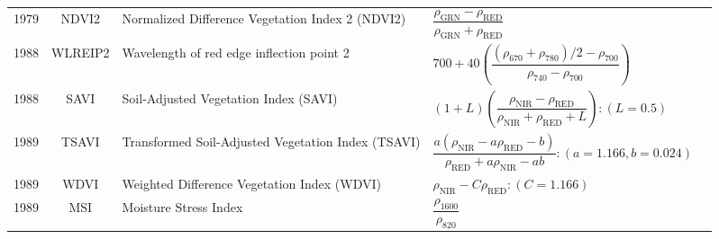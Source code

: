 \documentclass[10pt]{article}
\begin{document}
\begin{ThreePartTable}
\begin{longtable}{c c m{2.80in} M{2.80in} M{1.5in}}
  1979 & NDVI2   & Normalized Difference Vegetation Index 2 (NDVI2)                               & $\dfrac{\rho_\text{GRN}-\rho_\text{RED}}{\rho_\text{GRN}+\rho_\text{RED}}$                                                                                                                                                                                                              & \citet{Tucker1979}                                  \\
  1988 & WLREIP2 & Wavelength of red edge inflection point 2                                      & $700+40\left(\dfrac{(\rho_{670}+\rho_{780})/2-\rho_{700}}{\rho_{740}-\rho_{700}}\right)$                                                                                                                                                                                                & \citet{Guyot1988,Cho2006}                           \\
  1988 & SAVI    & Soil-Adjusted Vegetation Index (SAVI)                                          & $(1 + L)\left(\dfrac{\rho_\text{NIR}-\rho_\text{RED}}{\rho_\text{NIR}+\rho_\text{RED}+L}\right):(L=0.5)$                                                                                                                                                                                & \citet{Huete1988}                                   \\
  1989 & TSAVI   & Transformed Soil-Adjusted Vegetation Index (TSAVI)                             & $\dfrac{a(\rho_\text{NIR}-a\rho_\text{RED}-b)}{\rho_\text{RED}+a\rho_\text{NIR}-ab}:(a=1.166,b=0.024)$                                                                                                                                                                                  & \citet{Baret1989,Huete1984}                         \\
  1989 & WDVI    & Weighted Difference Vegetation Index (WDVI)                                    & $\rho_\text{NIR}-C\rho_\text{RED}:(C=1.166)$                                                                                                                                                                                                                                            & \citet{Clevers1989,Huete1984}                       \\
  1989 & MSI     & Moisture Stress Index                                                          & $\dfrac{\rho_{1600}}{\rho_{820}}$                                                                                                                                                                                                                                                       & \citet{Hunt1989}                                    \\

\end{longtable}
\end{ThreePartTable}
\end{document}
